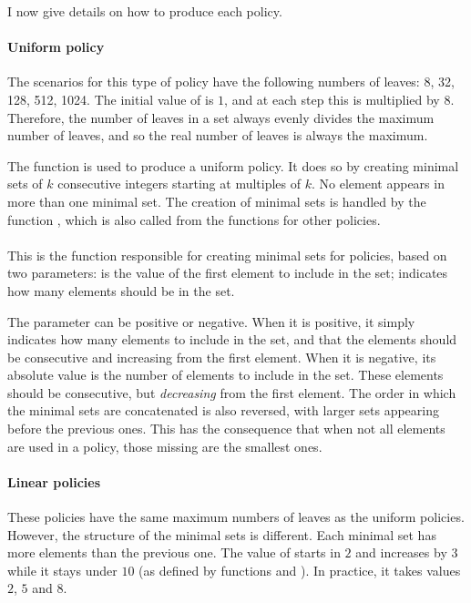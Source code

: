 \documentclass{article}
\begin{document}
I now give details on how to produce each policy.

\paragraph{Uniform policy}
The scenarios for this type of policy have the following numbers of leaves: 8, 32, 128, 512, 1024. 
The initial value of  is $1$, and at each step this is multiplied by $8$. Therefore, the number of leaves in a set always evenly divides the maximum number of leaves, and so the real number of leaves is always the maximum.

The function  is used to produce a uniform policy. It does so by creating minimal sets of $k$ consecutive integers starting at multiples of $k$. No element appears in more than one minimal set. The creation of minimal sets is handled by the function , which is also called from the functions for other policies.

\paragraph{}
This is the function responsible for creating minimal sets for policies, based on two parameters:  is the value of the first element to include in the set;  indicates how many elements should be in the set.

The parameter  can be positive or negative. When it is positive, it simply indicates how many elements to include in the set, and that the elements should be consecutive and increasing from the first element. When it is negative, its absolute value is the number of elements to include in the set. These elements should be consecutive, but \emph{decreasing} from the first element. The order in which the minimal sets are concatenated is also reversed, with larger sets appearing before the previous ones. This has the consequence that when not all elements are used in a policy, those missing are the smallest ones.

\paragraph{Linear policies}
These policies have the same maximum numbers of leaves as the uniform policies. However, the structure of the minimal sets is different. Each minimal set has  more elements than the previous one. The value of  starts in $2$ and increases by $3$ while it stays under $10$ (as defined by functions  and ). In practice, it takes values $2$, $5$ and $8$. 
\end{document}
